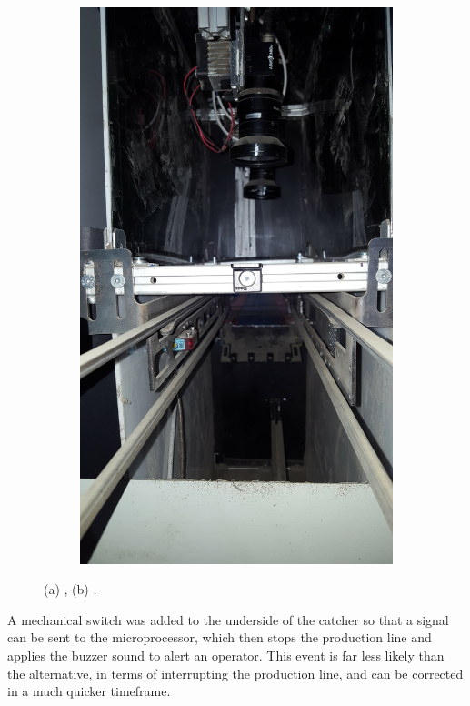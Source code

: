 \documentclass[fleqn,twoside]{article}
\begin{document}
\begin{figure}[ht]
\begin{subfigure}{.5\textwidth}
		\includegraphics[width=\linewidth, angle=270]{inside_enclosure_2.jpg}
		\caption{}
		\label{fig:inside_enclosure_2}
	\end{subfigure}%
	
	\caption{(a) , (b) .}
	\label{}
\end{figure}

A mechanical switch was added to the underside of the catcher so that a signal can be sent to the microprocessor, which then stops the production line and applies the buzzer sound to alert an operator. This event is far less likely than the alternative, in terms of interrupting the production line, and can be corrected in a much quicker timeframe.
\end{document}
